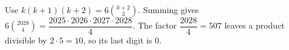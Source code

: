 Use $k(k+1)(k+2)=6\binom{k+2}3$. Summing gives $6\binom{2028}4=\dfrac{2025\cdot2026\cdot2027\cdot2028}{4}$. The factor $\dfrac{2028}{4} = 507$ leaves a product divisible by $2\cdot5=10$, so its last digit is $\boxed0$.
